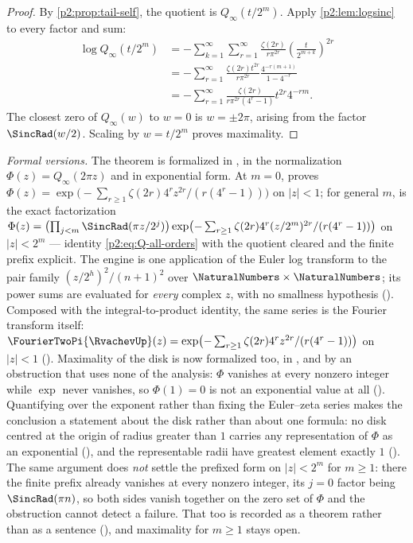 \documentclass[11pt,oneside]{article}
\numberwithin{equation}{section}
\theoremstyle{definition}
\theoremstyle{remark}
\begin{document}
\begin{proof}
By \cref{p2:prop:tail-self}, the quotient is $Q_\infty(t/2^m)$.  Apply
\cref{p2:lem:logsinc} to every factor and sum:
\begin{align*}
 \log Q_\infty(t/2^m)
 &=-\sum_{k=1}^{\infty}\sum_{r=1}^{\infty}
   \frac{\zeta(2r)}{r\pi^{2r}}
   \left(\frac{t}{2^{m+k}}\right)^{2r}\\
 &=-\sum_{r=1}^{\infty}\frac{\zeta(2r)t^{2r}}{r\pi^{2r}}
   \frac{4^{-r(m+1)}}{1-4^{-r}}\\
 &=-\sum_{r=1}^{\infty}
   \frac{\zeta(2r)}{r\pi^{2r}(4^r-1)}t^{2r}4^{-rm}.
\end{align*}
The closest zero of $Q_\infty(w)$ to $w=0$ is $w=\pm2\pi$, arising from the factor
$\SincRad(w/2)$.  Scaling by $w=t/2^m$ proves maximality.
\end{proof}

\emph{Formal versions.}  The theorem is formalized in , in the
normalization $\Phi(z)=Q_\infty(2\pi z)$ and in exponential form.  At $m=0$,
 proves
$\Phi(z)=\exp\bigl(-\sum_{r\ge1}\zeta(2r)4^rz^{2r}/(r(4^r-1))\bigr)$ on $|z|<1$; for general
$m$,  is the exact factorization
$\Phi(z)=\bigl(\prod_{j<m}\SincRad(\pi z/2^j)\bigr)\exp\bigl(-\sum_{r\ge1}
\zeta(2r)4^r(z/2^m)^{2r}/(r(4^r-1))\bigr)$ on $|z|<2^m$ --- identity \eqref{p2:eq:Q-all-orders}
with the quotient cleared and the finite prefix explicit.  The engine is one application of
the Euler log transform to the pair family $(z/2^h)^2/(n+1)^2$ over $\NaturalNumbers\times\NaturalNumbers$; its power
sums are evaluated for \emph{every} complex $z$, with no smallness hypothesis
().  Composed with the integral-to-product identity, the
same series is the Fourier transform itself:
$\FourierTwoPi{\RvachevUp}(z)=\exp\bigl(-\sum_{r\ge1}\zeta(2r)4^rz^{2r}/(r(4^r-1))\bigr)$ on $|z|<1$
().  Maximality of the disk is now formalized too, in
, and by an obstruction that uses none of the analysis:
$\Phi$ vanishes at every nonzero integer while $\exp$ never vanishes, so $\Phi(1)=0$ is not
an exponential value at all
().  Quantifying over the exponent rather
than fixing the Euler--zeta series makes the conclusion a statement about the disk rather
than about one formula: no disk centred at the origin of radius greater than $1$ carries any
representation of $\Phi$ as an exponential
(), and the representable radii have greatest
element exactly $1$
().  The same argument does \emph{not}
settle the prefixed form on $|z|<2^m$ for $m\ge1$: there the finite prefix already vanishes at
every nonzero integer, its $j=0$ factor being $\SincRad(\pi n)$, so both sides vanish together on
the zero set of $\Phi$ and the obstruction cannot detect a failure.  That too is recorded as a
theorem rather than as a sentence
(), and maximality for $m\ge1$ stays open.
\end{document}
